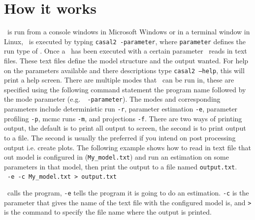 \section{How it works}\label{sec:intro}

\CNAME\ is run from a console windows in Microsoft Windows or in a terminal window in Linux, \CNAME\ is executed by typing \texttt{casal2 -parameter}, where \texttt{parameter} defines the run type of \CNAME. Once a \CNAME\ has been executed with a certain parameter \CNAME\ reads in text files. These text files define the model structure and the output wanted. For help on the parameters available and there descriptions type \texttt{casal2 --help}, this will print a help screen. There are multiple modes that \CNAME\ can be run in, these are specified using the following command statement the program name followed by the mode parameter (e.g.\CNAME\ \texttt{ -parameter}). The modes and corresponding parameters include deterministic run \texttt{-r}, parameter estimation \texttt{-e}, parameter profiling \texttt{-p}, mcmc runs \texttt{-m}, and projections \texttt{-f}. There are two ways of printing output, the default is to print all output to screen, the second is to print output to a file. The second is usually the preferred if you intend on post processing output i.e. create plots. The following example shows how to read in text file that out model is configured in (\texttt{My\_model.txt}) and run an estimation on some parameters in that model, then print the output to a file named \texttt{output.txt}.\\
\CNAME\ \texttt{-e  -c My\_model.txt > output.txt}

\CNAME\ calls the program, \texttt{-e} tells the program it is going to do an estimation. \texttt{-c} is the parameter that gives the name of the text file with the configured model is, and \texttt{>} is the command to specify the file name where the output is printed.
